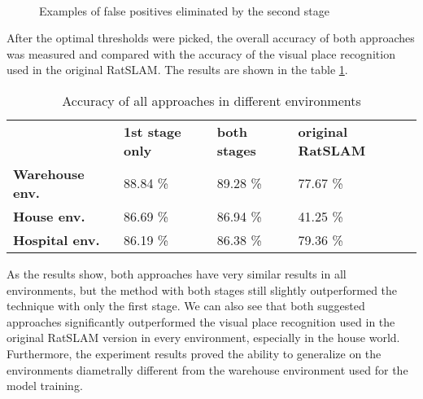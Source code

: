 \begin{figure}[!tbp]
    \centering
    \\
    \caption{Examples of false positives eliminated by the second stage}
    \label{fig:eliminatedFPExamples}
\end{figure}

After the optimal thresholds were picked, the overall accuracy of both approaches was measured and compared with the accuracy of the visual place recognition used in the original RatSLAM. The results are shown in the table \ref{tab:accuracy}.

\begin{table}[htpb]
    \caption{Accuracy of all approaches in different environments}\label{tab:accuracy}
    \centering
    \begin{tabular}{l l l l}
        \toprule
        \textbf{}               & \textbf{1st stage only} & \textbf{both stages} & \textbf{original RatSLAM} \\
        \textbf{Warehouse env.} & 88.84 \%                & 89.28 \%             & 77.67 \%                  \\
        \textbf{House env.}     & 86.69 \%                & 86.94 \%             & 41.25 \%                  \\
        \textbf{Hospital env.}  & 86.19 \%                & 86.38 \%             & 79.36 \%                  \\
        \bottomrule
    \end{tabular}
\end{table}

As the results show, both approaches have very similar results in all environments, but the method with both stages still slightly outperformed the technique with only the first stage. We can also see that both suggested approaches significantly outperformed the visual place recognition used in the original RatSLAM version in every environment, especially in the house world. Furthermore, the experiment results proved the ability to generalize on the environments diametrally different from the warehouse environment used for the model training.
